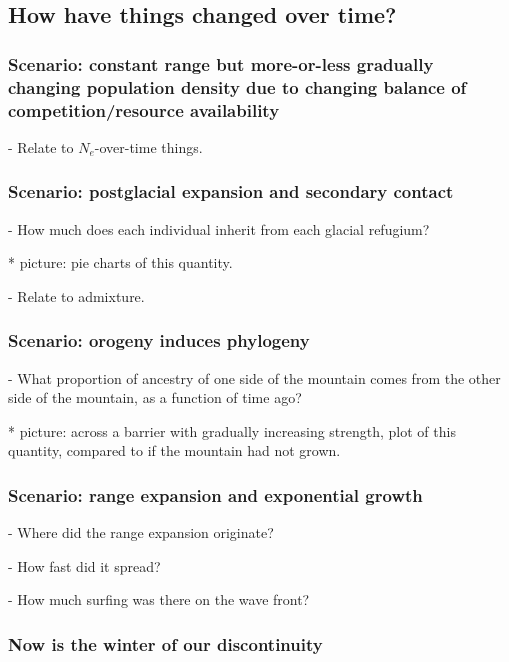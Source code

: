 \documentclass{ar-1col}
\begin{document}
\subsection{How have things changed over time?}
\subsubsection{Scenario: constant range but more-or-less gradually changing population density due to changing balance of competition/resource availability}

        - Relate to $N_e$-over-time things.

\subsubsection{Scenario: postglacial expansion and secondary contact}

        - How much does each individual inherit from each glacial refugium?

            * picture: pie charts of this quantity.

        - Relate to admixture.

\subsubsection{Scenario: orogeny induces phylogeny}

        - What proportion of ancestry of one side of the mountain comes from the other side of the mountain,
            as a function of time ago?

            * picture: across a barrier with gradually increasing strength,
                plot of this quantity, compared to if the mountain had not grown.

\subsubsection{Scenario: range expansion and exponential growth}

        - Where did the range expansion originate?

        - How fast did it spread?

        - How much surfing was there on the wave front?

\subsubsection{Now is the winter of our discontinuity}
\end{document}
